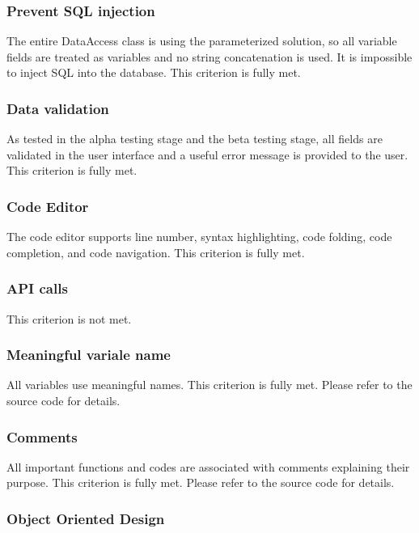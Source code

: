 \documentclass[report.tex]{subfiles}
\begin{document}
\subsubsection{Prevent SQL injection}

The entire DataAccess class is using the parameterized solution, so all variable fields are treated as variables and no string concatenation is used. It is impossible to inject SQL into the database. This criterion is fully met.

\subsubsection{Data validation}

As tested in the alpha testing stage and the beta testing stage, all fields are validated in the user interface and a useful error message is provided to the user. This criterion is fully met.

\subsubsection{Code Editor}

The code editor supports line number, syntax highlighting, code folding, code completion, and code navigation. This criterion is fully met.

\subsubsection{API calls}

This criterion is not met.

\subsubsection{Meaningful variale name}

All variables use meaningful names. This criterion is fully met. Please refer to the source code for details.

\subsubsection{Comments}

All important functions and codes are associated with comments explaining their purpose. This criterion is fully met. Please refer to the source code for details.

\subsubsection{Object Oriented Design}
\end{document}
